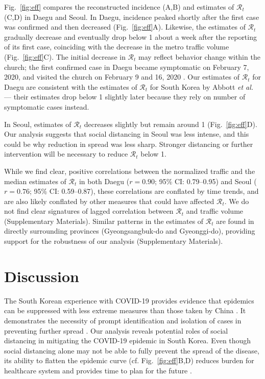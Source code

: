 \documentclass[12pt]{article}
\newcommand{\fref}[1]{Fig.~\ref{fig:#1}}
\begin{document}
\fref{eff} compares the reconstructed incidence (A,B) and estimates of $\mathcal R_t$ (C,D) in Daegu and Seoul.
In Daegu, incidence peaked shortly after the first case was confirmed and then decreased (\fref{eff}A).
Likewise, the estimates of $\mathcal R_t$ gradually decrease and eventually drop below 1 about a week after the reporting of its first case, coinciding with the decrease in the metro traffic volume (\fref{eff}C).
The initial decrease in $\mathcal R_t$ may reflect behavior change within the church; the first confirmed case in Daegu became symptomatic on February 7, 2020, and visited the church on February 9 and 16, 2020 \citep{kcdc}.
Our estimates of $\mathcal R_t$ for Daegu are consistent with the estimates of $\mathcal R_t$ for South Korea by Abbott \textit{et al.} \cite{tempvar} --- their estimates drop below 1 slightly later because they rely on number of symptomatic cases instead.

In Seoul, estimates of $\mathcal R_t$ decreases slightly but remain around 1 (\fref{eff}D).
Our analysis suggests that social distancing in Seoul was less intense, and this could be why reduction in spread was less sharp.
Stronger distancing or further intervention will be necessary to reduce $\mathcal R_t$ below 1.

While we find clear, positive correlations between the normalized traffic and the median estimates of $\mathcal R_t$ in both Daegu ($r=0.90$; 95\% CI: 0.79--0.95) and Seoul ($r=0.76$; 95\% CI: 0.59--0.87), these correlations are conflated by time trends, and are also likely conflated by other measures that could have affected $\mathcal R_t$.
We do not find clear signatures of lagged correlation between $\mathcal R_t$ and traffic volume (Supplementary Materials).
Similar patterns in the estimates of $\mathcal R_t$ are found in directly surrounding provinces (Gyeongsangbuk-do and Gyeonggi-do), providing support for the robustness of our analysis (Supplementary Materials).

\section{Discussion}

The South Korean experience with COVID-19 provides evidence that epidemics can be suppressed with less extreme measures than those taken by China \citep{kickbusch2020response}.
It demonstrates the necessity of prompt identification and isolation of cases in preventing further spread \citep{fergusonimpact, tracingkorea, science}.
Our analysis reveals potential roles of social distancing in mitigating the COVID-19 epidemic in South Korea.
Even though social distancing alone may not be able to fully prevent the spread of the disease, its ability to flatten the epidemic curve (cf. \fref{eff}B,D) reduces burden for healthcare system and provides time to plan for the future \citep{anderson2020will}.
\end{document}
